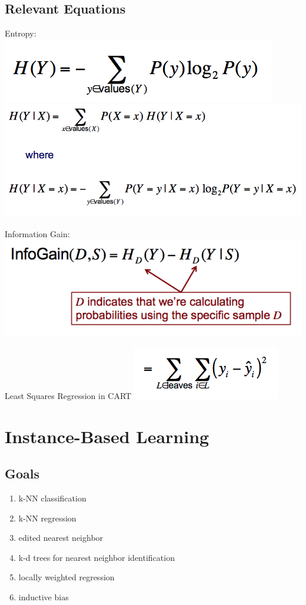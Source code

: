 \documentclass[a4paper]{article}
\begin{document}
\subsection{Relevant Equations}
Entropy:
\includegraphics{entropy} \\
\includegraphics{condentropy}

Information Gain:
\includegraphics{ig}

Least Squares Regression in CART
\includegraphics{lsr}

\section{Instance-Based Learning}
\subsection{Goals}
\begin{enumerate}
\item k-NN classification
\item k-NN regression
\item edited nearest neighbor
\item k-d trees for nearest neighbor identification
\item locally weighted regression
\item inductive bias
\end{enumerate}
\end{document}

